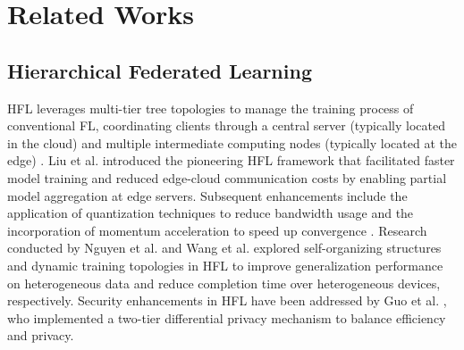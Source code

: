 \documentclass[10pt,journal]{IEEEtran}
\begin{document}
\section{Related Works}
\subsection{Hierarchical Federated Learning}
HFL leverages multi-tier tree topologies to manage the training process of conventional FL, coordinating clients through a central server (typically located in the cloud) and multiple intermediate computing nodes (typically located at the edge) \cite{duan2023combining}. Liu et al. \cite{liu2020client} introduced the pioneering HFL framework that facilitated faster model training and reduced edge-cloud communication costs by enabling partial model aggregation at edge servers. Subsequent enhancements include the application of quantization techniques to reduce bandwidth usage \cite{liu2023hierarchical} and the incorporation of momentum acceleration to speed up convergence \cite{yang2023hierarchical}. Research conducted by Nguyen et al. \cite{nguyen2023self} and Wang et al. \cite{wang2023accelerating} explored self-organizing structures and dynamic training topologies in HFL to improve generalization performance on heterogeneous data and reduce completion time over heterogeneous devices, respectively. Security enhancements in HFL have been addressed by Guo et al. \cite{guo2023privacy}, who implemented a two-tier differential privacy mechanism to balance efficiency and privacy.
\end{document}
